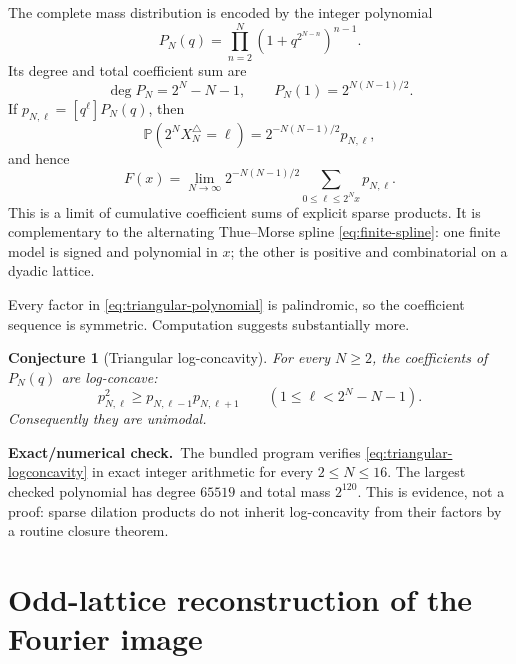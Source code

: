 \documentclass[11pt,oneside]{article}
\newtheorem{conjecture}[theorem]{Conjecture}
\theoremstyle{definition}
\theoremstyle{remark}
\newcommand{\Prob}{\mathbb P}
\newcommand{\1}{\mathbf 1}
\newcommand{\numerical}{\textcolor{newgreen}{\textbf{Exact/numerical check.}}\ }
\begin{document}
The complete mass distribution is encoded by the integer polynomial
\begin{equation}
 \boxed{\displaystyle
 P_N(q)=\prod_{n=2}^{N}
       \left(1+q^{2^{N-n}}\right)^{n-1}.}                \label{eq:triangular-polynomial}
\end{equation}
Its degree and total coefficient sum are
\begin{equation}
 \deg P_N=2^N-N-1,
 \qquad
 P_N(1)=2^{N(N-1)/2}.                                    \label{eq:triangular-polynomial-data}
\end{equation}
If $p_{N,\ell}=[q^\ell]P_N(q)$, then
\begin{equation}
 \Prob(2^NX_N^\triangle=\ell)
 =2^{-N(N-1)/2}p_{N,\ell},                              \label{eq:triangular-mass}
\end{equation}
and hence
\begin{equation}
 F(x)=\lim_{N\to\infty}
 2^{-N(N-1)/2}
 \sum_{0\le\ell\le2^Nx}p_{N,\ell}.                    \label{eq:triangular-coefficient-limit}
\end{equation}
This is a limit of cumulative coefficient sums of explicit sparse products.
It is complementary to the alternating Thue--Morse spline
\eqref{eq:finite-spline}: one finite model is signed and polynomial in $x$;
the other is positive and combinatorial on a dyadic lattice.

Every factor in \eqref{eq:triangular-polynomial} is palindromic, so the
coefficient sequence is symmetric.  Computation suggests substantially more.

\begin{conjecture}[Triangular log-concavity]
\label{conj:triangular-logconcavity}
For every $N\ge2$, the coefficients of $P_N(q)$ are log-concave:
\begin{equation}
 p_{N,\ell}^2\ge p_{N,\ell-1}p_{N,\ell+1}
 \qquad(1\le\ell<2^N-N-1).                              \label{eq:triangular-logconcavity}
\end{equation}
Consequently they are unimodal.
\end{conjecture}

\numerical The bundled program verifies
\eqref{eq:triangular-logconcavity} in exact integer arithmetic for every
$2\le N\le16$.  The largest checked polynomial has degree $65519$ and total
mass $2^{120}$.  This is evidence, not a proof: sparse dilation products do
not inherit log-concavity from their factors by a routine closure theorem.

\section{Odd-lattice reconstruction of the Fourier image}
\label{sec:shannon}
\end{document}
